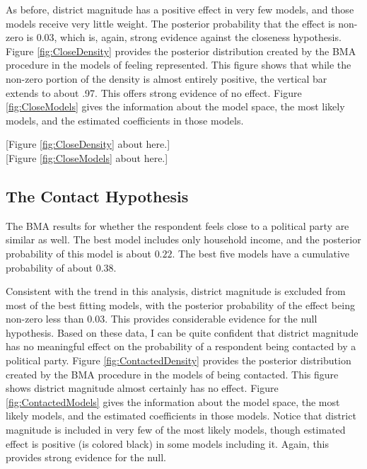\documentclass[12pt]{article}
\begin{document}
As before, district magnitude has a positive effect in very few models, and those models receive very little weight. The posterior probability that the effect is non-zero is $0.03$, which is, again, strong evidence against the closeness hypothesis. Figure \ref{fig:CloseDensity} provides the posterior distribution created by the BMA procedure in the models of feeling represented. This figure shows that while the non-zero portion of the density is almost entirely positive, the vertical bar extends to about .97. This offers strong evidence of no effect. Figure \ref{fig:CloseModels} gives the information about the model space, the most likely models, and the estimated coefficients in those models.
\begin{center}
[Figure \ref{fig:CloseDensity} about here.]\\

[Figure \ref{fig:CloseModels} about here.]
\end{center}

\subsection*{The Contact Hypothesis}

The BMA results for whether the respondent feels close to a political party are similar as well. The best model includes only household income, and the posterior probability of this model is about $0.22$. The best five models have a cumulative probability of about $0.38$.

Consistent with the trend in this analysis, district magnitude is excluded from most of the best fitting models, with the posterior probability of the effect being non-zero less than $0.03$. This provides considerable evidence for the null hypothesis. Based on these data, I can be quite confident that district magnitude has no meaningful effect on the probability of a respondent being contacted by a political party. Figure \ref{fig:ContactedDensity} provides the posterior distribution created by the BMA procedure in the models of being contacted. This figure shows district magnitude almost certainly has no effect. Figure \ref{fig:ContactedModels} gives the information about the model space, the most likely models, and the estimated coefficients in those models. Notice that district magnitude is included in very few of the most likely models, though estimated effect is positive (is colored black) in some models including it. Again, this provides strong evidence for the null. 
\end{document}
